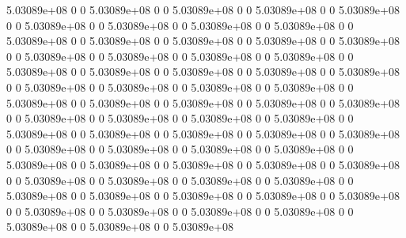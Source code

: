 5.03089e+08 0 0
5.03089e+08 0 0
5.03089e+08 0 0
5.03089e+08 0 0
5.03089e+08 0 0
5.03089e+08 0 0
5.03089e+08 0 0
5.03089e+08 0 0
5.03089e+08 0 0
5.03089e+08 0 0
5.03089e+08 0 0
5.03089e+08 0 0
5.03089e+08 0 0
5.03089e+08 0 0
5.03089e+08 0 0
5.03089e+08 0 0
5.03089e+08 0 0
5.03089e+08 0 0
5.03089e+08 0 0
5.03089e+08 0 0
5.03089e+08 0 0
5.03089e+08 0 0
5.03089e+08 0 0
5.03089e+08 0 0
5.03089e+08 0 0
5.03089e+08 0 0
5.03089e+08 0 0
5.03089e+08 0 0
5.03089e+08 0 0
5.03089e+08 0 0
5.03089e+08 0 0
5.03089e+08 0 0
5.03089e+08 0 0
5.03089e+08 0 0
5.03089e+08 0 0
5.03089e+08 0 0
5.03089e+08 0 0
5.03089e+08 0 0
5.03089e+08 0 0
5.03089e+08 0 0
5.03089e+08 0 0
5.03089e+08 0 0
5.03089e+08 0 0
5.03089e+08 0 0
5.03089e+08 0 0
5.03089e+08 0 0
5.03089e+08 0 0
5.03089e+08 0 0
5.03089e+08 0 0
5.03089e+08 0 0
5.03089e+08 0 0
5.03089e+08 0 0
5.03089e+08 0 0
5.03089e+08 0 0
5.03089e+08 0 0
5.03089e+08 0 0
5.03089e+08 0 0
5.03089e+08 0 0
5.03089e+08 0 0
5.03089e+08 0 0
5.03089e+08 0 0
5.03089e+08 0 0
5.03089e+08 0 0
5.03089e+08 0 0
5.03089e+08 0 0
5.03089e+08